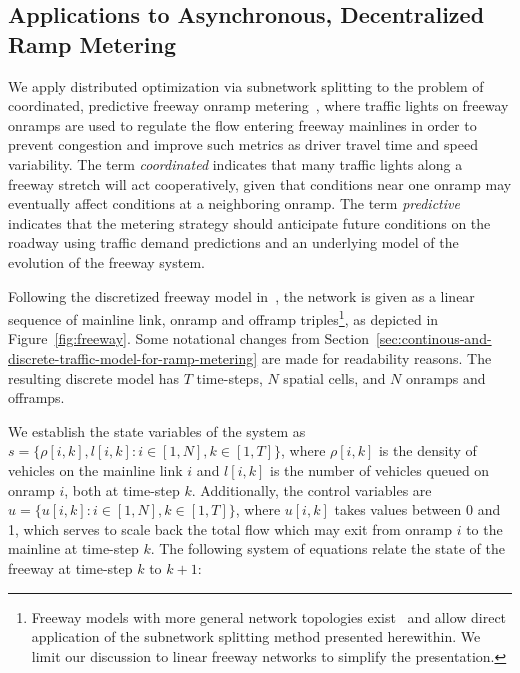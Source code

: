 \subsection{Applications to Asynchronous, Decentralized Ramp Metering}
\label{sec:ramp-metering-admm}

We apply distributed optimization via subnetwork splitting to the problem of coordinated, predictive freeway onramp metering~\cite{Papageorgiou1991Alinea,Frejo2011Feasible,Reilly2013AdjointBased}, where traffic lights on freeway onramps are used to regulate the flow entering freeway mainlines in order to prevent congestion and improve such metrics as driver travel time and speed variability. The term \emph{coordinated} indicates that many traffic lights along a freeway stretch will act cooperatively, given that conditions near one onramp may eventually affect conditions at a neighboring onramp. The term \emph{predictive} indicates that the metering strategy should anticipate future conditions on the roadway using traffic demand predictions and an underlying model of the evolution of the freeway system.

Following the discretized freeway model in~\cite{Monache2014PdeOde,Reilly2013AdjointBased}, the network is given as a linear sequence of mainline link, onramp and offramp triples\footnote{Freeway models with more general network topologies exist~\cite{garavello2006traffic} and allow direct application of the subnetwork splitting method presented herewithin. We limit our discussion to linear freeway networks to simplify the presentation.}, as depicted in Figure~\ref{fig:freeway}. Some notational changes from Section~\ref{sec:continous-and-discrete-traffic-model-for-ramp-metering} are made for readability reasons. The resulting discrete model has $T$ time-steps, $N$ spatial cells, and $N$ onramps and offramps.

We establish the state variables of the system as $s=\{\rho\left[i,k\right],l\left[i,k\right] : i\in\left[1,N\right], k\in\left[1,T\right]\}$, where $\rho\left[i,k\right]$ is the density of vehicles on the mainline link $i$ and $l\left[i,k\right]$ is the number of vehicles queued on onramp $i$, both at time-step $k$. Additionally, the control variables are $u=\{u\left[i,k\right] : i\in\left[1,N\right], k\in\left[1,T\right]\}$, where $u\left[i,k\right]$ takes values between 0 and 1, which serves to scale back the total flow which may exit from onramp $i$ to the mainline at time-step $k$. The following system of equations relate the state of the freeway at time-step $k$ to $k+1$:

